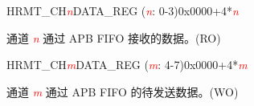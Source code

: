 \begin{register}{H}{RMT\_CH\textcolor{red}{\it{n}}DATA\_REG (\textcolor{red}{\it{n}}: 0-3)}{0x0000+4*\textcolor{red}{\it{n}}}\label{regdesc:RMTCHnDATAREG}
%
\regnewline%
\begin{regdesc}\begin{reglist}
\label{fielddesc:RMTCHNDATA}\item [RMT\_CH\textcolor{red}{\it{n}}DATA] 通道 \textcolor{red}{\it{n}} 通过 APB FIFO 接收的数据。(RO)
\end{reglist}\end{regdesc}
\end{register}


\begin{register}{H}{RMT\_CH\textcolor{red}{\it{m}}DATA\_REG (\textcolor{red}{\it{m}}: 4-7)}{0x0000+4*\textcolor{red}{\it{m}}}\label{regdesc:RMTCHMDATAREG}
%
\regnewline%
\begin{regdesc}\begin{reglist}
\label{fielddesc:RMTCHMDATA}\item [RMT\_CH\textcolor{red}{\it{m}}DATA] 通道 \textcolor{red}{\it{m}} 通过 APB FIFO 的待发送数据。(WO)
\end{reglist}\end{regdesc}
\end{register}


